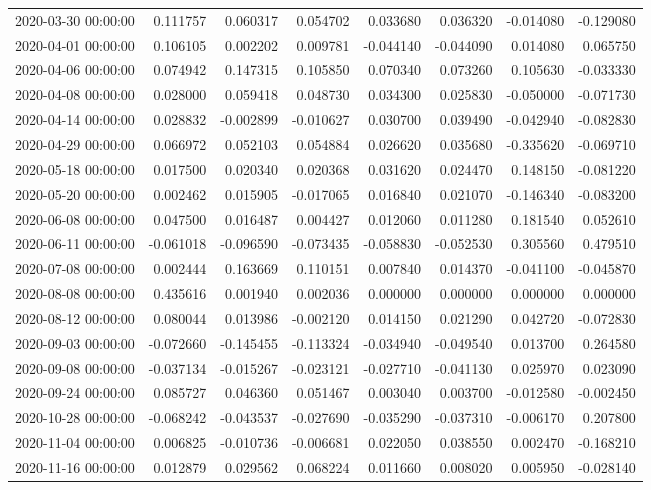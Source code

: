 \begin{tabular}{lrrrrrrr}
2020-03-30 00:00:00 & 0.111757 & 0.060317 & 0.054702 & 0.033680 & 0.036320 & -0.014080 & -0.129080 \\
2020-04-01 00:00:00 & 0.106105 & 0.002202 & 0.009781 & -0.044140 & -0.044090 & 0.014080 & 0.065750 \\
2020-04-06 00:00:00 & 0.074942 & 0.147315 & 0.105850 & 0.070340 & 0.073260 & 0.105630 & -0.033330 \\
2020-04-08 00:00:00 & 0.028000 & 0.059418 & 0.048730 & 0.034300 & 0.025830 & -0.050000 & -0.071730 \\
2020-04-14 00:00:00 & 0.028832 & -0.002899 & -0.010627 & 0.030700 & 0.039490 & -0.042940 & -0.082830 \\
2020-04-29 00:00:00 & 0.066972 & 0.052103 & 0.054884 & 0.026620 & 0.035680 & -0.335620 & -0.069710 \\
2020-05-18 00:00:00 & 0.017500 & 0.020340 & 0.020368 & 0.031620 & 0.024470 & 0.148150 & -0.081220 \\
2020-05-20 00:00:00 & 0.002462 & 0.015905 & -0.017065 & 0.016840 & 0.021070 & -0.146340 & -0.083200 \\
2020-06-08 00:00:00 & 0.047500 & 0.016487 & 0.004427 & 0.012060 & 0.011280 & 0.181540 & 0.052610 \\
2020-06-11 00:00:00 & -0.061018 & -0.096590 & -0.073435 & -0.058830 & -0.052530 & 0.305560 & 0.479510 \\
2020-07-08 00:00:00 & 0.002444 & 0.163669 & 0.110151 & 0.007840 & 0.014370 & -0.041100 & -0.045870 \\
2020-08-08 00:00:00 & 0.435616 & 0.001940 & 0.002036 & 0.000000 & 0.000000 & 0.000000 & 0.000000 \\
2020-08-12 00:00:00 & 0.080044 & 0.013986 & -0.002120 & 0.014150 & 0.021290 & 0.042720 & -0.072830 \\
2020-09-03 00:00:00 & -0.072660 & -0.145455 & -0.113324 & -0.034940 & -0.049540 & 0.013700 & 0.264580 \\
2020-09-08 00:00:00 & -0.037134 & -0.015267 & -0.023121 & -0.027710 & -0.041130 & 0.025970 & 0.023090 \\
2020-09-24 00:00:00 & 0.085727 & 0.046360 & 0.051467 & 0.003040 & 0.003700 & -0.012580 & -0.002450 \\
2020-10-28 00:00:00 & -0.068242 & -0.043537 & -0.027690 & -0.035290 & -0.037310 & -0.006170 & 0.207800 \\
2020-11-04 00:00:00 & 0.006825 & -0.010736 & -0.006681 & 0.022050 & 0.038550 & 0.002470 & -0.168210 \\
2020-11-16 00:00:00 & 0.012879 & 0.029562 & 0.068224 & 0.011660 & 0.008020 & 0.005950 & -0.028140 \\

\end{tabular}
